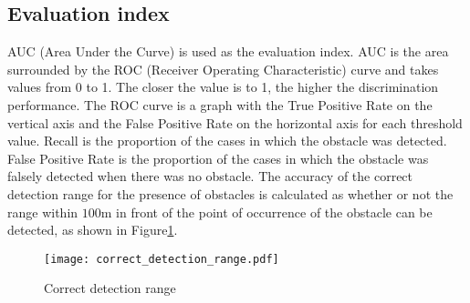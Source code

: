 \documentclass[paper]{ieice}
\begin{document}
\subsection{Evaluation index}
\label{sec:evaluation_index}
%
AUC (Area Under the Curve) is used as the evaluation index.
%
AUC is the area surrounded by the ROC (Receiver Operating Characteristic) curve and takes values from 0 to 1.
%
The closer the value is to 1, the higher the discrimination performance.
%
%
The ROC curve is a graph with the True Positive Rate on the vertical axis and the False Positive Rate on the horizontal axis for each threshold value.
%
%
Recall is the proportion of the cases in which the obstacle was detected.
%
False Positive Rate is the proportion of the cases in which the obstacle was falsely detected when there was no obstacle.
%
The accuracy of the correct detection range for the presence of obstacles is calculated as whether or not the range within $100 \mathrm{m}$ in front of the point of occurrence of the obstacle can be detected, as shown in Figure\ref{fig:correct_detection_range}.
%
\begin{figure}[tb]
  \begin{center}
    \texttt{[image: correct\_detection\_range.pdf]}
  \end{center}
  \caption{Correct detection range}
  \label{fig:correct_detection_range}
\end{figure}


\end{document}
